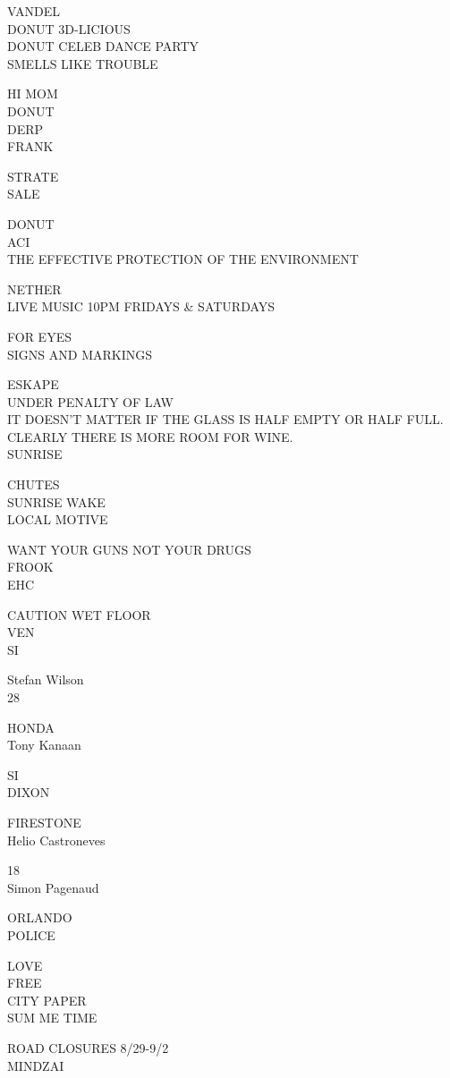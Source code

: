\documentclass[10pt,letterpaper]{article}
\begin{document}
VANDEL\\
DONUT 3D{-}LICIOUS\\
DONUT CELEB DANCE PARTY\\
SMELLS LIKE TROUBLE

HI MOM\\
DONUT\\
DERP\\
FRANK

STRATE\\
SALE

DONUT\\
ACI\\
THE EFFECTIVE PROTECTION OF THE ENVIRONMENT

NETHER\\
LIVE MUSIC 10PM FRIDAYS \& SATURDAYS

FOR EYES\\
SIGNS AND MARKINGS

ESKAPE\\
UNDER PENALTY OF LAW\\
IT DOESN'T MATTER IF THE GLASS IS HALF EMPTY OR HALF FULL.  CLEARLY THERE IS MORE ROOM FOR WINE.\\
SUNRISE

CHUTES\\
SUNRISE WAKE\\
LOCAL MOTIVE

WANT YOUR GUNS NOT YOUR DRUGS\\
FROOK\\
EHC

CAUTION WET FLOOR\\
VEN\\
SI

Stefan Wilson\\
28

HONDA\\
Tony Kanaan

SI\\
DIXON

FIRESTONE\\
Helio Castroneves

18\\
Simon Pagenaud

ORLANDO\\
POLICE

LOVE\\
FREE\\
CITY PAPER\\
SUM ME TIME

ROAD CLOSURES 8/29{-}9/2\\
MINDZAI
\end{document}
